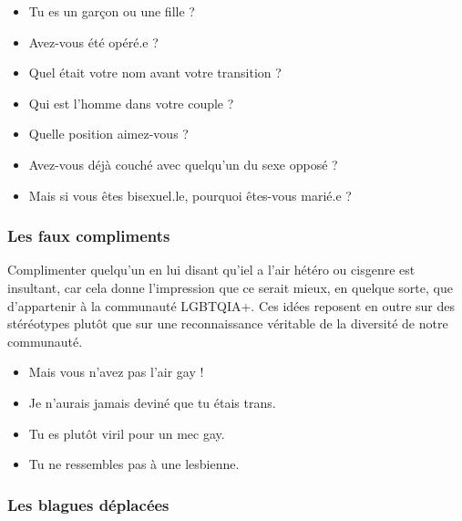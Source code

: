 \documentclass[12pt,openany]{book}
\begin{document}
\begin{itemize}[label=\textbullet]
  \setlength\itemsep{-0.3em}
  \item Tu es un garçon ou une fille ?
  \item Avez-vous été opéré.e ?
  \item Quel était votre nom avant votre transition ?
  \item Qui est l’homme dans votre couple ?
  \item Quelle position aimez-vous ?
  \item Avez-vous déjà couché avec quelqu’un du sexe opposé ?
  \item Mais si vous êtes bisexuel.le, pourquoi êtes-vous marié.e ?
\end{itemize}

\subsubsection*{Les faux compliments}

\noindent Complimenter quelqu’un en lui disant qu’iel a l’air hétéro ou cisgenre est insultant, car cela donne l’impression que ce serait mieux, en quelque sorte, que d’appartenir à la communauté \mbox{LGBTQIA+}. Ces idées reposent en outre sur des stéréotypes plutôt que sur une reconnaissance véritable de la diversité de notre communauté.
\begin{figure}
\end{figure}
\begin{itemize}[label=\textbullet]
  \setlength\itemsep{-0.3em}
  \item Mais vous n’avez pas l’air gay !
  \item Je n’aurais jamais deviné que tu étais trans.
  \item Tu es plutôt viril pour un mec gay.
  \item Tu ne ressembles pas à une lesbienne.
\end{itemize}

\subsubsection*{Les blagues déplacées} 
\end{document}
